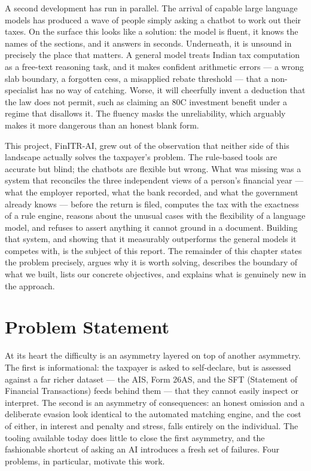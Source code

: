 A second development has run in parallel. The arrival of capable large language
models has produced a wave of people simply asking a chatbot to work out their
taxes. On the surface this looks like a solution: the model is fluent, it knows
the names of the sections, and it answers in seconds. Underneath, it is unsound
in precisely the place that matters. A general model treats Indian tax
computation as a free-text reasoning task, and it makes confident arithmetic
errors --- a wrong slab boundary, a forgotten cess, a misapplied rebate
threshold --- that a non-specialist has no way of catching. Worse, it will
cheerfully invent a deduction that the law does not permit, such as claiming an
80C investment benefit under a regime that disallows it. The fluency masks the
unreliability, which arguably makes it more dangerous than an honest blank form.

This project, FinITR-AI, grew out of the observation that neither side of this
landscape actually solves the taxpayer's problem. The rule-based tools are
accurate but blind; the chatbots are flexible but wrong. What was missing was a
system that reconciles the three independent views of a person's financial year
--- what the employer reported, what the bank recorded, and what the government
already knows --- before the return is filed, computes the tax with the
exactness of a rule engine, reasons about the unusual cases with the flexibility
of a language model, and refuses to assert anything it cannot ground in a
document. Building that system, and showing that it measurably outperforms the
general models it competes with, is the subject of this report. The remainder of
this chapter states the problem precisely, argues why it is worth solving,
describes the boundary of what we built, lists our concrete objectives, and
explains what is genuinely new in the approach.

\section{Problem Statement}
\label{sec:problem-statement}

At its heart the difficulty is an asymmetry layered on top of another asymmetry.
The first is informational: the taxpayer is asked to self-declare, but is
assessed against a far richer dataset --- the AIS, Form 26AS, and the SFT
(Statement of Financial Transactions) feeds behind them --- that they cannot
easily inspect or interpret. The second is an asymmetry of consequences: an
honest omission and a deliberate evasion look identical to the automated
matching engine, and the cost of either, in interest and penalty and stress,
falls entirely on the individual. The tooling available today does little to
close the first asymmetry, and the fashionable shortcut of asking an AI
introduces a fresh set of failures. Four problems, in particular, motivate this
work.

